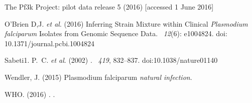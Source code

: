 \documentclass{bioinfo}
\begin{document}
\begin{thebibliography}{}
The Pf3k Project: pilot data release 5 (2016)
 [accessed 1 June 2016]

O'Brien D,J. {\em et al}. (2016)
\newblock Inferring Strain Mixture within Clinical {\em Plasmodium falciparum} Isolates from Genomic Sequence Data.
~{\em 12\/}(6): e1004824. doi: 10.1371/journal.pcbi.1004824

Sabeti1. P.~C. {\em et al}. (2002)
.
~{\em 419\/}, 832--837. doi:10.1038/nature01140

Wendler, J. (2015)
 {P}lasmodium falciparum {\em natural infection}.

WHO. (2016)
.
.
\end{thebibliography}
\end{document}
